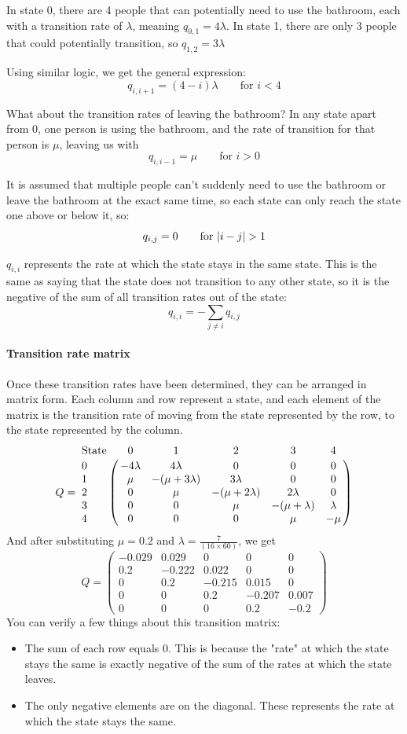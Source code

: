 In state 0, there are 4 people that can potentially need to use the bathroom, each with a transition rate of $\lambda$, meaning $q_{0, 1} = 4\lambda$. In state 1, there are only 3 people that could potentially transition, so $q_{1, 2} = 3\lambda$

Using similar logic, we get the general expression:
$$q_{i, i+1} = (4-i)\lambda \qquad \text{for } i < 4 $$

What about the transition rates of leaving the bathroom? In any state apart from 0, one person is using the bathroom, and the rate of transition for that person is $\mu$, leaving us with 
$$q_{i, i-1}=\mu \qquad \text{for } i > 0$$

It is assumed that multiple people can't suddenly need to use the bathroom or leave the bathroom at the exact same time, so each state can only reach the state one above or below it, so:
$$q_{i, j} = 0 \qquad \text{for } \lvert i-j\rvert>1 $$

$q_{i, i}$ represents the rate at which the state stays in the same state. This is the same as saying that the state does not transition to any other state, so it is the negative of the sum of all transition rates out of the state:
$$q_{i, i} = -\sum_{j \neq i} q_{i, j} $$

\paragraph{Transition rate matrix}
Once these transition rates have been determined, they can be arranged in matrix form. Each column and row represent a state, and each element of the matrix is the transition rate of moving from the state represented by the row, to the state represented by the column.
$$
Q=
\bordermatrix{	\text{State} 	&\text{0} 	&\text{1}	& \text{2} 	& \text{3} 	& \text{4} \cr
\text{0} 	& -4\lambda &	4\lambda	&	0 			& 0 			& 0	\cr
\text{1} 	&   \mu  	&-(\mu+3\lambda)&3\lambda 		& 0 			& 0	\cr
\text{2} 	&   0  		&	\mu			&-(\mu+2\lambda)&2\lambda 		& 0	\cr
\text{3} 	&   0  		&	0			&	\mu 		&-(\mu+\lambda)	& \lambda\cr
\text{4}	&	0		&	0			&	0			& \mu 			& -\mu}
$$
And after substituting $\mu = 0.2 $ and $\lambda = \frac{7}{(16 \times 60)} $, we get
$$ Q=
\begin{pmatrix}
-0.029	&	0.029	&	0 		& 0 		& 0	\\
0.2  	&	-0.222	& 0.022 	& 0 		& 0	\\
0  		&	0.2		&-0.215		&0.015 		& 0	\\
0  		&	0		&	0.2 	&-0.207		& 0.007\\
0		&	0		&	0		& 0.2 		& -0.2
\end{pmatrix}
$$
You can verify a few things about this transition matrix:
\begin{itemize}
	\item The sum of each row equals 0. This is because the "rate" at which the state stays the same is exactly negative of the sum of the rates at which the state leaves.
	\item The only negative elements are on the diagonal. These represents the rate at which the state stays the same.
\end{itemize}


